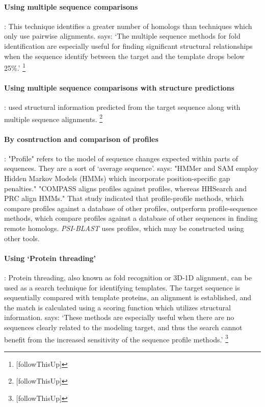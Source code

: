 \documentclass[10pt]{report}
\begin{document}
\paragraph{Using multiple sequence comparisons}: This technique identifies a greater number of homologs than techniques which only use pairwise alignments. \cite{marti-renom2000com} says: `The multiple sequence methods for fold identification are especially useful for finding significant structural relationships when the sequence identify between the target and the template drops below 25\%.' \footnote{[followThisUp]}

\paragraph{Using multiple sequence comparisons with structure predictions}: \cite{fischer97} used structural information predicted from the target sequence along with multiple sequence alignments. \footnote{[followThisUp]}

\paragraph{By cosntruction and comparison of profiles}: "Profile" refers to the model of sequence changes expected within parts of sequences. They are a sort of `average sequence'. \cite{reid07homologyDetection} says: "HMMer and SAM employ Hidden Markov Models (HMMs) which incorporate position-specific gap penalties." "COMPASS aligns profiles against profiles, whereas HHSearch and PRC align HMMs." That study indicated that profile-profile methods, which compare profiles against a database of other profiles, outperform profile-sequence methods, which compare profiles against a database of other sequences in finding remote homologs. \textit{PSI-BLAST} uses profiles, which may be constructed using other tools.

\paragraph{Using `Protein threading'}: Protein threading, also known as fold recognition or 3D-1D alignment, can be used as a search technique for identifying templates. The target sequence is sequentially compared with template proteins, an alignment is established, and the match is calculated using a scoring function which utilizes structural information. \cite{marti-renom2000com} says: `These methods are especially useful when there are no sequences clearly related to the modeling target, and thus the search cannot benefit from the increased sensitivity of the sequence profile methods.' \footnote{[followThisUp]}
\end{document}
